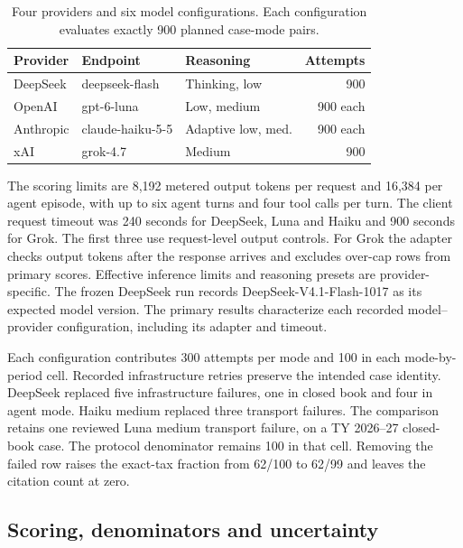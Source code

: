 \documentclass[10pt,letterpaper,twocolumn]{article}
\begin{document}
\begin{table}[!tb]
  \centering\small
  \setlength{\tabcolsep}{3pt}
  \caption{Four providers and six model configurations. Each configuration evaluates exactly 900 planned case-mode pairs.}
  \label{tab:model-configurations}
  \begin{tabular*}{\columnwidth}{@{\extracolsep{\fill}}lllr@{}}
    \toprule
    \textbf{Provider} & \textbf{Endpoint} & \textbf{Reasoning} & \textbf{Attempts} \\
    \midrule
    DeepSeek & deepseek-flash & Thinking, low & 900 \\
    OpenAI & gpt-6-luna & Low, medium & 900 each \\
    Anthropic & claude-haiku-5-5 & Adaptive low, med. & 900 each \\
    xAI & grok-4.7 & Medium & 900 \\
    \bottomrule
  \end{tabular*}
\end{table}

The scoring limits are 8,192 metered output tokens per request and 16,384 per agent episode, with up to six agent turns and four tool calls per turn. The client request timeout was 240 seconds for DeepSeek, Luna and Haiku and 900 seconds for Grok. The first three use request-level output controls. For Grok the adapter checks output tokens after the response arrives and excludes over-cap rows from primary scores. Effective inference limits and reasoning presets are provider-specific. The frozen DeepSeek run records DeepSeek-V4.1-Flash-1017 as its expected model version. The primary results characterize each recorded model--provider configuration, including its adapter and timeout.

Each configuration contributes 300 attempts per mode and 100 in each mode-by-period cell. Recorded infrastructure retries preserve the intended case identity. DeepSeek replaced five infrastructure failures, one in closed book and four in agent mode. Haiku medium replaced three transport failures. The comparison retains one reviewed Luna medium transport failure, on a TY 2026--27 closed-book case. The protocol denominator remains 100 in that cell. Removing the failed row raises the exact-tax fraction from 62/100 to 62/99 and leaves the citation count at zero.

\subsection{Scoring, denominators and uncertainty}
\end{document}
